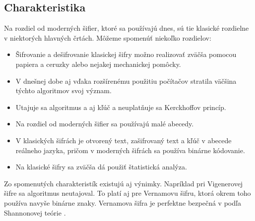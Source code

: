 \subsection{Charakteristika}
Na rozdiel od moderných šifier, ktoré sa používajú dnes, sú tie klasické rozdielne v niektorých hlavných črtách.
Môžeme spomenúť niekoľko rozdielov:
\begin{itemize}
\item Šifrovanie a dešifrovanie klasickej šifry možno realizovať zväčša pomocou papiera a ceruzky alebo nejakej mechanickej pomôcky.
\item V dnešnej dobe aj vďaka rozšírenému použitiu počítačov stratila väčšina týchto algoritmov svoj význam.
\item Utajuje sa algoritmus a aj kľúč a neuplatňuje sa Kerckhoffov princíp.
\item Na rozdiel od moderných šifier sa používajú malé abecedy.
\item V klasických šifrách je otvorený text, zašifrovaný text a kľúč v abecede reálneho jazyka, pričom v moderných šifrách sa používa binárne kódovanie.
\item Na klasické šifry sa zväčša dá použiť štatistická analýza. 
\end{itemize}
Zo spomenutých charakteristík existujú aj výnimky. Napríklad pri Vigenerovej šifre sa algoritmus neutajoval. To platí aj pre Vernamovu šifru, ktorá okrem toho používa navyše binárne znaky. Vernamova šifra je perfektne bezpečná v podľa Shannonovej teórie \cite{ks}.

